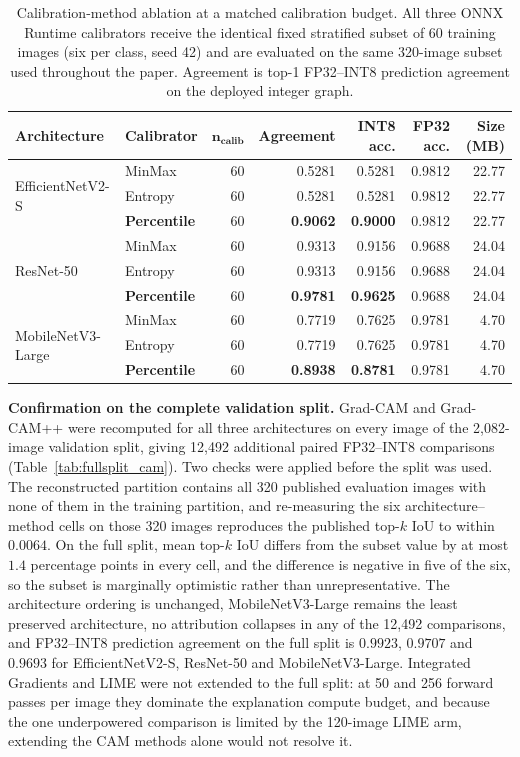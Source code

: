\documentclass[fleqn,10pt]{wlscirep}
\begin{document}
\begin{table}[htbp]
\centering
\small
\caption{Calibration-method ablation at a matched calibration budget. All three ONNX Runtime calibrators receive the identical fixed stratified subset of 60 training images (six per class, seed 42) and are evaluated on the same 320-image subset used throughout the paper. Agreement is top-1 FP32--INT8 prediction agreement on the deployed integer graph.}
\label{tab:calib_matched}
\begin{tabular}{llrrrrr}
\toprule
\textbf{Architecture} & \textbf{Calibrator} & $\boldsymbol{n_{\text{calib}}}$ & \textbf{Agreement} & \textbf{INT8 acc.} & \textbf{FP32 acc.} & \textbf{Size (MB)} \\
\midrule
\multirow{3}{*}{EfficientNetV2-S} & MinMax & 60 & 0.5281 & 0.5281 & 0.9812 & 22.77 \\
 & Entropy & 60 & 0.5281 & 0.5281 & 0.9812 & 22.77 \\
 & \textbf{Percentile} & 60 & \textbf{0.9062} & \textbf{0.9000} & 0.9812 & 22.77 \\
\midrule
\multirow{3}{*}{ResNet-50} & MinMax & 60 & 0.9313 & 0.9156 & 0.9688 & 24.04 \\
 & Entropy & 60 & 0.9313 & 0.9156 & 0.9688 & 24.04 \\
 & \textbf{Percentile} & 60 & \textbf{0.9781} & \textbf{0.9625} & 0.9688 & 24.04 \\
\midrule
\multirow{3}{*}{MobileNetV3-Large} & MinMax & 60 & 0.7719 & 0.7625 & 0.9781 & 4.70 \\
 & Entropy & 60 & 0.7719 & 0.7625 & 0.9781 & 4.70 \\
 & \textbf{Percentile} & 60 & \textbf{0.8938} & \textbf{0.8781} & 0.9781 & 4.70 \\
\bottomrule
\end{tabular}
\end{table}

\textbf{Confirmation on the complete validation split.} Grad-CAM and Grad-CAM++ were recomputed for all three architectures on every image of the 2{,}082-image validation split, giving 12{,}492 additional paired FP32--INT8 comparisons (Table~\ref{tab:fullsplit_cam}). Two checks were applied before the split was used. The reconstructed partition contains all 320 published evaluation images with none of them in the training partition, and re-measuring the six architecture--method cells on those 320 images reproduces the published top-$k$ IoU to within $0.0064$. On the full split, mean top-$k$ IoU differs from the subset value by at most $1.4$ percentage points in every cell, and the difference is negative in five of the six, so the subset is marginally optimistic rather than unrepresentative. The architecture ordering is unchanged, MobileNetV3-Large remains the least preserved architecture, no attribution collapses in any of the 12{,}492 comparisons, and FP32--INT8 prediction agreement on the full split is $0.9923$, $0.9707$ and $0.9693$ for EfficientNetV2-S, ResNet-50 and MobileNetV3-Large. Integrated Gradients and LIME were not extended to the full split: at 50 and 256 forward passes per image they dominate the explanation compute budget, and because the one underpowered comparison is limited by the 120-image LIME arm, extending the CAM methods alone would not resolve it.
\end{document}
